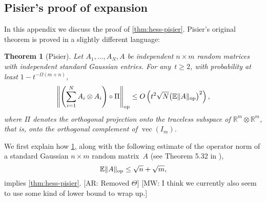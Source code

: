 \documentclass[aos]{imsart}
\newtheorem{theorem}{Theorem}[section]
\theoremstyle{definition}
\numberwithin{equation}{section}
\DeclareMathOperator{\op}{op}
\DeclareMathOperator{\vect}{vec}
\DeclarePairedDelimiter{\norm}{\lVert}{\rVert}
\newcommand{\R}{{\mathbb{R}}}
\newcommand{\ot}{\otimes}
\newcommand{\E}{\mathbb{E}}
\newcommand{\AR}[1]{{\color{orange}[AR: #1]}}
\newcommand{\MW}[1]{{\color{red}[MW: #1]}}
\begin{document}
\begin{appendix}

\section{Pisier's proof of expansion}\label{sec:pisier}
In this appendix we discuss the proof of \cref{thm:hess-pisier}.
Pisier's original theorem is proved in a slightly different language:

\begin{theorem}[Pisier]\label{thm:Pisier-expansion}
Let $A_1,\dots,A_N,A$ be independent $n \times m$ random matrices with independent standard Gaussian entries.
For any~$t \geq 2$, with probability at least $1 - t^{-\Omega(m+n)}$,
\begin{align*}
  \norm*{\left(\sum_{i=1}^N A_i \otimes A_i \right) \circ \Pi}_{\op}
  \leq O\left( t^2 \sqrt{N} \bigl( \E \norm{A}_{\op} \bigr)^2 \right),
\end{align*}
where $\Pi$ denotes the orthogonal projection onto the traceless subspace of $\R^m \ot \R^m$, that is, onto the orthogonal complement of $\vect(I_m)$.
\end{theorem}

We first explain how \cref{thm:Pisier-expansion}, along with the following estimate of the operator norm of a standard Gaussian $n \times m$ random matrix~$A$ (see Theorem 5.32 in \cite{vershynin2010introduction}),
\begin{equation}\label{eq:op norm bound}
  \E \norm{A}_{\op} \leq \sqrt{n} + \sqrt{m},
\end{equation}
implies \cref{thm:hess-pisier}. \AR{Removed $\Theta$} \MW{I think we currently also seem to use some kind of lower bound to wrap up.}


\end{appendix}
\end{document}
